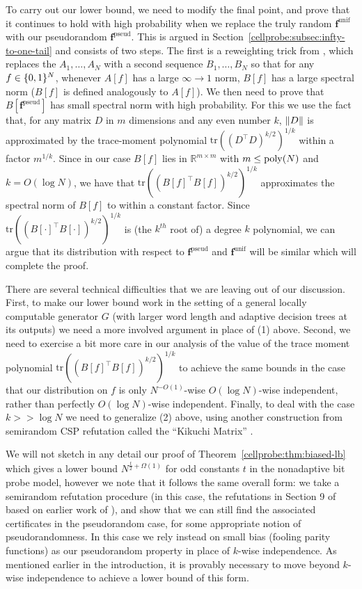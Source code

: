 To carry out our lower bound, we need to modify the final point, and prove that it continues to hold with high probability when we replace the truly random $\bm{f}^{\mathrm{unif}}$ with our pseudorandom $\bm{f}^{\mathrm{pseud}}$. This is argued in Section~\ref{cellprobe:subsec:infty-to-one-tail} and consists of two steps. The first is a reweighting trick from \cite{smoothed}, which replaces the $A_1,\ldots,A_N$ with a second sequence $B_1,\ldots,B_N$ so that for any $f \in \{0,1\}^N$, whenever $A[f]$ has a large $\infty\to 1$ norm, $B[f]$ has a large spectral norm ($B[f]$ is defined analogously to $A[f]$). We then need to prove that $B[\bm{f}^{\mathrm{pseud}}]$ has small spectral norm with high probability. For this we use the fact that, for any matrix $D$ in $m$ dimensions and any even number $k$, $\Vert D \Vert$ is approximated by the trace-moment polynomial $\mathrm{tr}( (D^\top D)^{k/2})^{1/k}$ within a factor $m^{1/k}$. Since in our case $B[f]$ lies in $\mathbb{R}^{m\times m}$ with $m \leq \mathrm{poly}(N)$ and $k= O(\log N)$, we have that $\mathrm{tr}((B[f]^\top B[f])^{k/2})^{1/k}$ approximates the spectral norm of $B[f]$ to within a constant factor. Since $\mathrm{tr}((B[\cdot ]^\top B[\cdot ])^{k/2})^{1/k}$ is (the $k^{th}$ root of) a degree $k$ polynomial, we can argue that its distribution with respect to $\bm{f}^{\mathrm{pseud}}$ and $\bm{f}^{\mathrm{unif}}$ will be similar which will complete the proof.

There are several technical difficulties that we are leaving out of our discussion. First, to make our lower bound work in the setting of a general locally computable generator $G$ (with larger word length and adaptive decision trees at its outputs) we need a more involved argument in place of (1) above. Second, we need to exercise a bit more care in our analysis of the value of the trace moment polynomial $\mathrm{tr}((B[f]^\top B[f])^{k/2})^{1/k}$ to achieve the same bounds in the case that our distribution on $f$ is only $N^{-O(1)}$-wise $O(\log N)$-wise independent, rather than perfectly $O(\log N)$-wise independent. Finally, to deal with the case $k >> \log N$ we need to generalize (2) above, using another construction from semirandom CSP refutation called the ``Kikuchi Matrix'' \cite{wein2019kikuchi,smoothed}. 

We will not sketch in any detail our proof of Theorem~\ref{cellprobe:thm:biased-lb} which gives a lower bound $N^{\frac{t}{2} + \Omega(1)}$ for odd constants $t$ in the nonadaptive bit probe model, however we note that it follows the same overall form: we take a semirandom refutation procedure (in this case, the refutations in Section 9 of \cite{smoothed} based on earlier work of \cite{FKO}), and show that we can still find the associated certificates in the pseudorandom case, for some appropriate notion of pseudorandomness. In this case we rely instead on small bias (fooling parity functions) as our pseudorandom property in place of $k$-wise independence. As mentioned earlier in the introduction, it is provably necessary to move beyond $k$-wise independence to achieve a lower bound of this form.

